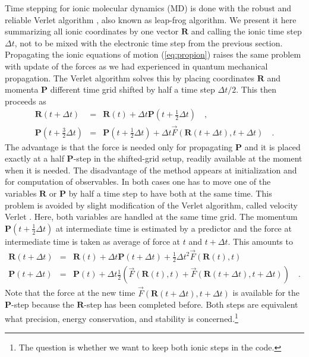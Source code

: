 \documentclass[final,1p]{elsarticle}
\newcommand{\PGRfoot}[1]{{\color{blue}\footnote{\color{blue} #1}}}
\begin{document}
Time stepping for ionic molecular dynamics (MD) is done with the
robust and reliable Verlet algorithm \cite{Ver67,Pre92}, also known as
leap-frog algorithm. We present it here summarizing all ionic
coordinates by one vector $\mathbf{R}$ and calling the
ionic time step $\Delta t$, not to be mixed with the electronic time
step from the previous section.
Propagating the ionic equations of motion (\ref{eq:propion})
raises the same problem with update of the forces as we had
experienced in quantum mechanical propagation. The Verlet algorithm
solves this by placing coordinates $\mathbf{R}$ and momenta
$\mathbf{P}$ different time grid shifted by half a time step
$\Delta t/2$. This then proceeds as
\begin{subequations}
\begin{eqnarray}
  \mathbf{R}(t\!+\!\Delta t)
  &=&
  \mathbf{R}(t) + \Delta
  t\mathbf{P}(t\!+\!{\textstyle\frac{1}{2}}\Delta t)
  \quad,
\label{eq:Verlet1}\\
  \mathbf{P}(t\!+\!{\textstyle\frac{3}{2}}\Delta t)
  &=&
  \mathbf{P}(t\!+\!{\textstyle\frac{1}{2}}\Delta t)
  + \Delta t\vec{F}(\mathbf{R}(t\!+\!\Delta t),t\!+\!\Delta t)
  \quad.
\end{eqnarray}
\end{subequations}
The advantage is that the force is needed only for propagating
$\mathbf{P}$ and it is placed exactly at a half $\mathbf{P}$-step in
the shifted-grid setup, readily available at the moment when it is
needed. The disadvantage of the method appears at initialization and
for computation of observables. In both cases one has to move one of
the variables $\mathbf{R}$ or $\mathbf{P}$ by half a time step to have
both at the same time.  This problem is avoided by slight modification
of the Verlet algorithm, called velocity Verlet \cite{Pre92}. Here,
both variables are handled at the same time grid.  The momentum
$\mathbf{P}(t\!+\!{\textstyle\frac{1}{2}}\Delta t)$ at intermediate
time is estimated by a predictor and the force at intermediate
time is taken as average of force at $t$ and $t\!+\!\Delta t$.
This amounts to
\begin{subequations}
\label{eq:velverlet}
\begin{eqnarray}
  \mathbf{R}(t\!+\!\Delta t)
  &=&
  \mathbf{R}(t)
  + \Delta t\mathbf{P}(t\!+\!\Delta t)
  + {\textstyle\frac{1}{2}}\Delta t^2\vec{F}(\mathbf{R}(t),t)
\nonumber \\
  \mathbf{P}(t\!+\!\Delta t)
  &=&
  \mathbf{P}(t)
  +
  \Delta t\frac{1}{2}
   \left(\vec{F}(\mathbf{R}(t),t)
          +\vec{F}(\mathbf{R}(t\!+\!\Delta t),t\!+\!\Delta t)\right)
  \quad.
\label{eq:velverlet2}
\end{eqnarray}
\end{subequations}
Note that the force at the new time
$\vec{F}(\mathbf{R}(t\!+\!\Delta t),t\!+\!\Delta t)$ is available for
the $\mathbf{P}$-step because the $\mathbf{R}$-step has been
completed before. Both steps are equivalent what precision, energy
conservation, and stability is concerned.\PGRfoot{The question is
  whether we want to keep both ionic steps in the code.}
\end{document}
